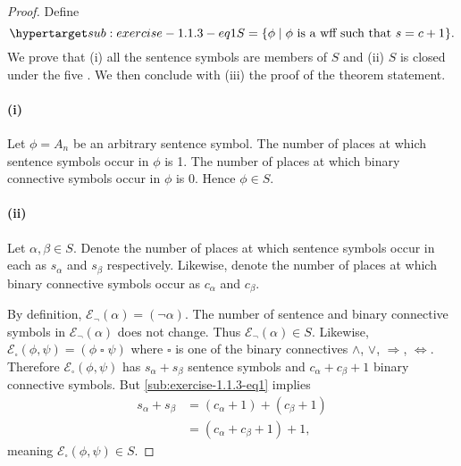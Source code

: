 \documentclass{report}
\begin{document}
  \begin{proof}

    Define
      \begin{equation}
        \hyperlabel{sub:exercise-1.1.3-eq1}
        S = \{\phi \mid \phi \text{ is a wff such that } s = c + 1\}.
      \end{equation}
    We prove that (i) all the sentence symbols are members of $S$ and (ii)
      $S$ is closed under the five .
    We then conclude with (iii) the proof of the theorem statement.

    \paragraph{(i)}%

      Let $\phi = A_n$ be an arbitrary sentence symbol.
      The number of places at which sentence symbols occur in $\phi$ is 1.
      The number of places at which binary connective symbols occur in $\phi$ is
        0.
      Hence $\phi \in S$.

    \paragraph{(ii)}%

      Let $\alpha, \beta \in S$.
      Denote the number of places at which sentence symbols occur in each as
        $s_\alpha$ and $s_\beta$ respectively.
      Likewise, denote the number of places at which binary connective symbols
        occur as $c_\alpha$ and $c_\beta$.

      By definition, $\mathcal{E}_{\neg}(\alpha) = (\neg\alpha)$.
      The number of sentence and binary connective symbols in
        $\mathcal{E}_{\neg}(\alpha)$ does not change.
      Thus $\mathcal{E}_{\neg}(\alpha) \in S$.
      Likewise,
        $\mathcal{E}_{\square}(\phi, \psi) = (\phi \mathop{\square} \psi)$
        where $\square$ is one of the binary connectives $\land$, $\lor$,
          $\Rightarrow$, $\Leftrightarrow$.
      Therefore $\mathcal{E}_{\square}(\phi, \psi)$ has $s_\alpha + s_\beta$
        sentence symbols and $c_\alpha + c_\beta + 1$ binary connective symbols.
      But \eqref{sub:exercise-1.1.3-eq1} implies
        \begin{align*}
          s_\alpha + s_\beta
            & = (c_\alpha + 1) + (c_\beta + 1) \\
            & = (c_\alpha + c_\beta + 1) + 1,
        \end{align*}
      meaning $\mathcal{E}_{\square}(\phi, \psi) \in S$.


\end{proof}
\end{document}
